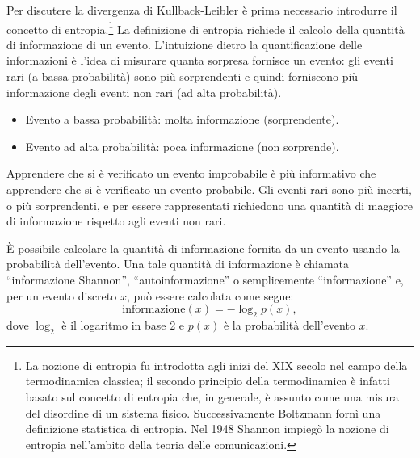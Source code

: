 \documentclass[
  10pt,
  italian,
  a4paper,
  extrafontsizes,onecolumn,openright
  ]{memoir}
\providecommand{\tightlist}{%
  \setlength{\itemsep}{0pt}\setlength{\parskip}{0pt}}
\theoremstyle{definition}
\theoremstyle{definition}
\theoremstyle{definition}
\theoremstyle{definition}
\theoremstyle{remark}
\begin{document}
Per discutere la divergenza di Kullback-Leibler è prima necessario introdurre il concetto di entropia.\footnote{La nozione di entropia fu introdotta agli inizi del XIX secolo nel campo della termodinamica classica; il secondo principio della termodinamica è infatti basato sul concetto di entropia che, in generale, è assunto come una misura del disordine di un sistema fisico. Successivamente Boltzmann fornì una definizione statistica di entropia. Nel 1948 Shannon impiegò la nozione di entropia nell'ambito della teoria delle comunicazioni.} La definizione di entropia richiede il calcolo della quantità di informazione di un evento. L'intuizione dietro la quantificazione delle informazioni è l'idea di misurare quanta sorpresa fornisce un evento: gli eventi rari (a bassa probabilità) sono più sorprendenti e quindi forniscono più informazione degli eventi non rari (ad alta probabilità).

\begin{itemize}
\tightlist
\item
  Evento a bassa probabilità: molta informazione (sorprendente).
\item
  Evento ad alta probabilità: poca informazione (non sorprende).
\end{itemize}

\noindent
Apprendere che si è verificato un evento improbabile è più informativo che apprendere che si è verificato un evento probabile. Gli eventi rari sono più incerti, o più sorprendenti, e per essere rappresentati richiedono una quantità di maggiore di informazione rispetto agli eventi non rari.

È possibile calcolare la quantità di informazione fornita da un evento usando la probabilità dell'evento. Una tale quantità di informazione è chiamata ``informazione Shannon'', ``autoinformazione'' o semplicemente ``informazione'' e, per un evento discreto \(x\), può essere calcolata come segue:
\[
\text{informazione}(x) = -\log_2 p(x),
\]
dove \(\log_2\) è il logaritmo in base 2 e \(p(x)\) è la probabilità dell'evento \(x\).
\end{document}
